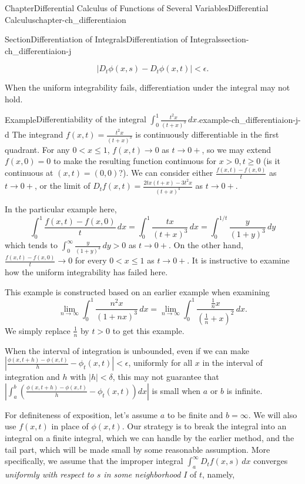 \documentclass[oneside,10pt,]{book}
\numberwithin{equation}{section}
\begin{document}
\begin{chapterptx}{Chapter}{Differential Calculus of Functions of Several Variables}{}{Differential Calculus}{}{}{chapter-ch_differentiaion}
\begin{sectionptx}{Section}{Differentiation of Integrals}{}{Differentiation of Integrals}{}{}{section-ch_differentiaion-j}
\begin{introduction}{}
\begin{equation*}
|D_{t}\phi(x, s)- D_{t}\phi(x, t)| < \epsilon.
\end{equation*}
%
\end{introduction}%
When the uniform integrability fails, differentiation under the integral may not hold.%
\begin{example}{Example}{Differentiability of the integral \(\int_{0}^{1}\frac{t^{2}x}{(t+x)^{3}}\,dx\).}{example-ch_differentiaion-j-d}%
The integrand \(f(x, t)=\frac{t^{2}x}{(t+x)^{3}}\) is continuously differentiable in the first quadrant. For any \(0 < x \le 1\), \(f(x, t)\to 0\) as \(t\to 0+\), so we may extend \(f(x, 0)=0\) to make the resulting function  continuous for \(x>0, t\ge 0\) (is it continuous at \((x ,t)=(0, 0)\)?). We can consider either \(\frac{f(x, t)-f(x, 0)}{t}\) as \(t\to 0+\), or the limit of \(D_{t}f(x, t)=\frac{2tx (t+x)-3t^{2}x}{(t+x)^{4}}\) as \(t\to 0+\).%
\par
In the particular example here,%
\begin{equation*}
\int_{0}^{1} \frac{f(x, t)-f(x, 0)}{t} \, dx = \int_{0}^{1} \frac{t x}{(t+x)^{3}}\, dx
=\int_{0}^{1/t}\frac{y}{(1+y)^{3}}\, dy
\end{equation*}
which tends to \(\int_{0}^{\infty}\frac{y}{(1+y)^{3}}\, dy>0\) as \(t\to 0+\). On the other hand, \(\frac{f(x, t)-f(x, 0)}{t} \to 0\) for every \(0 < x \le 1\) as \(t\to 0+\). It is instructive to examine how the uniform integrability has failed here.%
\par
This example is constructed based on an earlier example when examining%
\begin{equation*}
\lim_{n\to \infty} \int_{0}^{1}\frac{n^{2} x}{(1+nx)^{3}}\, dx=
\lim_{n\to \infty} \int_{0}^{1}\frac{\frac 1n x}{(\frac 1n + x)^{2}}\, dx.
\end{equation*}
We simply replace \(\frac 1n\) by \(t>0\) to get this example.%
\end{example}
When the interval of integration is unbounded, even if we can make \(|  \frac{\phi(x,t+h)-\phi(x,t)}{h} - \phi_t(x,t) |< \epsilon\), uniformly for all \(x\) in the interval of integration and \(h\) with \(|h|< \delta\), this may not guarantee that \(\left| \int_a^b \left(  \frac{\phi(x,t+h)-\phi(x,t)}{h} - \phi_t(x,t) \right) dx \right|\) is small when \(a\) or \(b\) is infinite.%
\par
For definiteness of exposition, let's assume \(a\) to be finite and \(b=\infty\). We will also use \(f(x, t)\) in place of \(\phi(x, t)\). Our strategy is to break the integral into an integral on a finite integral, which we can handle by the earlier method, and the tail part, which will be made small by some reasonable assumption. More specifically,  we assume that the improper integral \(\int_a^{\infty} D_t f(x,s)\,dx\) converges  \emph{uniformly with respect to \(s\) in some neighborhood} \(I\) of \(t\), namely, \begin{quote}%

\end{quote}
\end{sectionptx}
\end{chapterptx}
\end{document}
